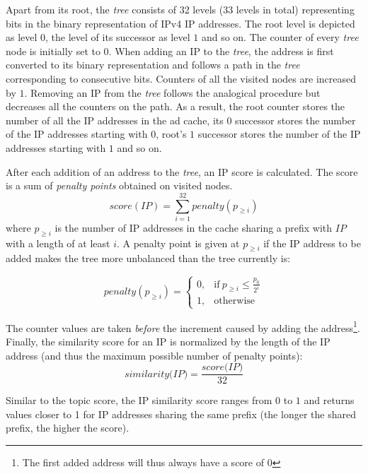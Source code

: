 Apart from its root, the \emph{tree} consists of 32 levels (33 levels in total) representing bits in the binary representation of IPv4 IP addresses. 
The root level is depicted as level $0$, the level of its successor as level $1$ and so on. 
The counter of every \emph{tree} node is initially set to $0$. When adding an IP to the \emph{tree}, the address is first converted to its binary representation and follows a path in the \emph{tree} corresponding to consecutive bits. 
Counters of all the visited nodes are increased by $1$. Removing an IP from the \emph{tree} follows the analogical procedure but decreases all the counters on the path. 
As a result, the root counter stores the number of all the IP addresses in the ad cache, its $0$ successor stores the number of the IP addresses starting with $0$, root's $1$ successor stores the number of the IP addresses starting with $1$ and so on. 

After each addition of an address to the \emph{tree}, an IP score is calculated.
The score is a sum of \emph{penalty points} obtained on visited nodes. 
$$score(IP)=\sum_{i=1}^{32} \textit{penalty}(p_{\geq i}) $$
where $p_{\geq i}$ is the number of IP addresses in the cache sharing a prefix with $IP$ with a length of at least $i$. A penalty point is given at $p_{\geq i}$ if the IP address to be added makes the tree more unbalanced than the tree currently is:

\begin{equation}
    \textit{penalty}(p_{\geq i})=
    \begin{cases}
      0, & \text{if}\ p_{\geq i} \leq \frac{p_0}{2^i} \\
      1, & \text{otherwise}
    \end{cases}
  \end{equation}

The counter values are taken \emph{before} the increment caused by adding the address\footnote{The first added address will thus always have a score of $0$}. 
Finally, the similarity score for an IP is normalized by the length of the IP address (and thus the maximum possible number of penalty points):
\begin{equation}
    \textit{similarity(IP}) = \frac{\textit{score(IP)}}{32}
\end{equation}

Similar to the topic score, the IP similarity score ranges from $0$ to $1$ and returns values closer to 1 for IP addresses sharing the same prefix (the longer the shared prefix, the higher the score).

